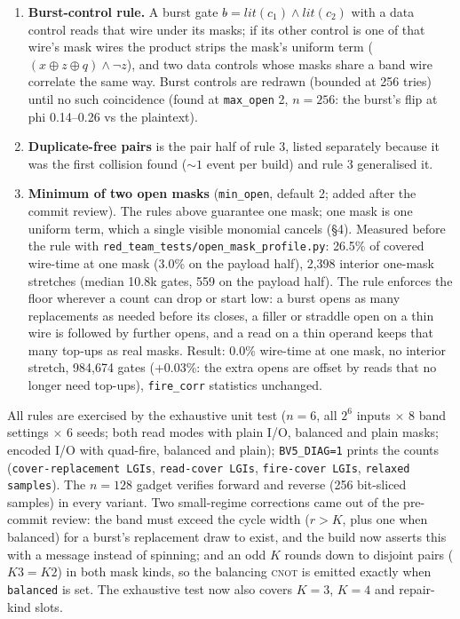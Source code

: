 \documentclass[11pt]{article}
\newcommand{\xor}{\oplus}
\newcommand{\doc}[1]{\texttt{#1}}
\begin{document}
\begin{enumerate}
  fires at 256). Every monomial block is therefore bracketed by a temporary mask on $c$ drawn
  away from every band wire of the fire, opened before the first monomial and closed after
  the last; the mid-fire straddle open is drawn away from those wires too. Four gates per
  fire (two with plain masks), ${\approx}3\%$ of the build, no change to any read polynomial. (A \emph{permanent}
  extra cover was measured at +62\% because open masks inflate every later read polynomial,
  and rejected.)
\item \textbf{Burst-control rule.} A burst gate $b\mathrel{\hat{}}=\mathit{lit}(c_1)\wedge
  \mathit{lit}(c_2)$ with a data control reads that wire under its masks; if its other control
  is one of that wire's mask wires the product strips the mask's uniform term
  ($(x\xor z\xor q)\wedge\neg z$), and two data controls whose masks share a band wire
  correlate the same way. Burst controls are redrawn (bounded at 256 tries) until no such
  coincidence (found at \doc{max\_open} 2, $n=256$: the burst's flip at phi 0.14--0.26 vs
  the plaintext).
\item \textbf{Duplicate-free pairs} is the pair half of rule 3, listed separately because it
  was the first collision found (${\sim}1$ event per build) and rule 3 generalised it.
\item \textbf{Minimum of two open masks} (\doc{min\_open}, default 2; added after the commit
  review). The rules above guarantee one mask; one mask is one uniform term, which a single
  visible monomial cancels (\S4). Measured before the rule with
  \doc{red\_team\_tests/open\_mask\_profile.py}: 26.5\% of covered wire-time at one mask
  (3.0\% on the payload half), 2,398 interior one-mask stretches (median 10.8k gates, 559 on
  the payload half). The rule enforces the floor wherever a count can drop or start low: a
  burst opens as many replacements as needed before its closes, a filler or straddle open on
  a thin wire is followed by further opens, and a read on a thin operand keeps that many
  top-ups as real masks. Result: 0.0\% wire-time at one mask, no interior stretch, 984,674
  gates (+0.03\%: the extra opens are offset by reads that no longer need top-ups),
  \doc{fire\_corr} statistics unchanged.
\end{enumerate}

All rules are exercised by the exhaustive unit test ($n=6$, all $2^6$ inputs $\times$ 8 band
settings $\times$ 6 seeds; both read modes with plain I/O, balanced and plain masks; encoded
I/O with quad-fire, balanced and plain); \doc{BV5\_DIAG=1}
prints the counts (\doc{cover-replacement LGIs}, \doc{read-cover LGIs}, \doc{fire-cover LGIs},
\doc{relaxed samples}). The $n=128$ gadget verifies forward and reverse (256 bit-sliced
samples) in every variant. Two small-regime corrections came out of the pre-commit review:
the band must exceed the cycle width ($r > K$, plus one when balanced) for a burst's
replacement draw to exist, and the build now asserts this with a message instead of
spinning; and an odd $K$ rounds down to disjoint pairs ($K3 = K2$) in both mask kinds, so the
balancing \textsc{cnot} is emitted exactly when \doc{balanced} is set. The exhaustive test now
also covers $K=3$, $K=4$ and repair-kind slots.
\end{document}
